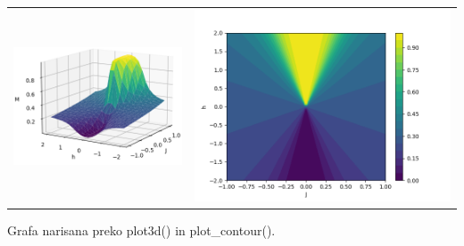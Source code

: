 \documentclass{article}
\begin{document}
\begin{tabular}{c c}
     \includegraphics[width = .5 \linewidth]{STFIM2.png}
     &  
     \includegraphics[width = .5 \linewidth]{STFIM3.png}\\
\end{tabular}
Grafa narisana preko plot3d() in plot\_contour(). \\\\
\end{document}

